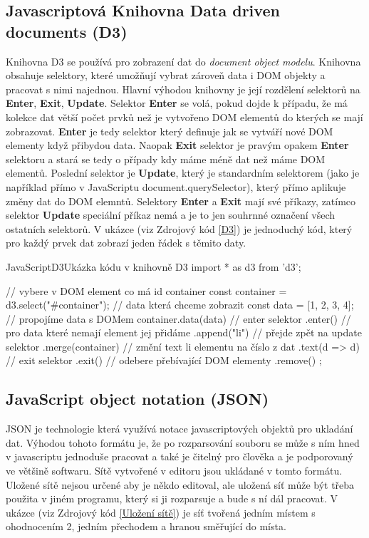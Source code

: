 \documentclass[
  biblatex,
  glossaries,
]{kidiplom}
\begin{document}
\subsection{Javascriptová Knihovna Data driven documents (D3)}
Knihovna D3 se používá pro zobrazení dat do 
\textit{document object modelu}.
Knihovna obsahuje selektory, které umožňují vybrat zároveň data 
i DOM objekty a pracovat s nimi najednou. Hlavní výhodou knihovny 
je její rozdělení selektorů na \textbf{Enter}, \textbf{Exit}, \textbf{Update}.
Selektor \textbf{Enter} se volá, pokud dojde k případu, že má kolekce 
dat větší počet prvků než je vytvořeno DOM elementů do kterých se mají zobrazovat.
\textbf{Enter} je tedy selektor který definuje jak se vytváří nové DOM elementy 
když přibydou data. Naopak \textbf{Exit} selektor je pravým opakem \textbf{Enter}
selektoru a stará se tedy o případy kdy máme méně dat než máme DOM elementů.
Poslední selektor je \textbf{Update}, který je standardním selektorem 
(jako je například přímo v JavaScriptu document.querySelector), který přímo 
aplikuje změny dat do DOM elemntů. Selektory \textbf{Enter} a \textbf{Exit} 
mají své příkazy, zatímco selektor \textbf{Update} speciální příkaz nemá a je to jen 
souhrnné označení všech ostatních selektorů. V ukázce (viz Zdrojový kód \ref{D3}) je
jednoduchý kód, který pro každý prvek dat zobrazí jeden řádek s těmito daty.

\begin{kicode}{JavaScript}{D3}{Ukázka kódu v knihovně D3}
import * as d3 from 'd3';

// vybere v DOM element co má id container
const container = d3.select("#container");
// data která chceme zobrazit 
const data = [1, 2, 3, 4];
// propojíme data s DOMem
container.data(data)
    // enter selektor
    .enter()
    // pro data které nemají element jej přidáme
    .append("li")
    // přejde zpět na update selektor
    .merge(container)
    // změní text li elementu na číslo z dat
    .text(d => d)
    // exit selektor
    .exit()
    // odebere přebívající DOM elementy
    .remove()
    ;
  
\end{kicode}



\subsection{JavaScript object notation (JSON)}
JSON je technologie která využívá notace javascriptových objektů pro ukladání dat.
Výhodou tohoto formátu je, že po rozparsování souboru se může s ním hned v 
javascriptu jednoduše pracovat a také je čitelný pro člověka a je podporovaný ve většině softwaru.
Sítě vytvořené v editoru jsou ukládané v tomto formátu.
Uložené sítě nejsou určené aby je někdo editoval, ale uložená síť může být třeba 
použita v jiném programu, který si ji rozparsuje a bude s ní dál pracovat.
V ukázce (viz Zdrojový kód \ref{Uložení sítě}) je síť tvořená jedním místem s ohodnocením 2, 
jedním přechodem a hranou směřující do místa.
\clearpage
\end{document}
